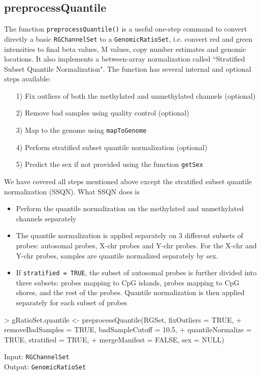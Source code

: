 \documentclass[12pt]{article}
\newcommand{\Rcode}[1]{{\texttt{#1}}}
\begin{document}
\subsection*{preprocessQuantile}
The function \Rcode{preprocessQuantile()} is a useful one-step command to convert directly a basic \Rcode{RGChannelSet} to a \Rcode{GenomicRatioSet}, i.e. convert red and green intensities to final beta values, M values, copy number estimates and genomic locations. It also implements a between-array normalization called ``Stratified Subset Quantile Normalization". The function has several internal and optional steps available: 
\begin{itemize}
\item[1)] Fix outliers of both the methylated and unmethylated channels (optional)
\item[2)] Remove bad samples using quality control (optional)
\item[3)] Map to the genome using \texttt{mapToGenome}
\item[4)] Perform stratified subset quantile normalization (optional)
\item[5)] Predict the sex if not provided using the function \texttt{getSex} 
\end{itemize}
We have covered all steps mentioned above except the stratified subset quantile normalization (SSQN). What SSQN does is 
\begin{itemize}
\item Perform the quantile normalization on the methylated and unmethylated channels separately
\item The quantile normalization is applied separately on 3 different subsets of probes: autosomal probes, X-chr probes and Y-chr probes. For the X-chr and Y-chr probes, samples are quantile normalized separately by sex.
\item If \texttt{stratified = TRUE}, the subset of autosomal probes is further divided into three subsets: probes mapping to CpG islands, probes mapping to CpG shores, and the rest of the probes. Quantile normalization is then applied separately for each subset of probes
\end{itemize}

\begin{Schunk}
\begin{Sinput}
> gRatioSet.quantile <- preprocessQuantile(RGSet, fixOutliers = TRUE,
+ removeBadSamples = TRUE, badSampleCutoff = 10.5,
+ quantileNormalize = TRUE, stratified = TRUE, 
+ mergeManifest = FALSE, sex = NULL)
\end{Sinput}
\end{Schunk}
Input: \Rcode{RGChannelSet}\\
Output: \Rcode{GenomicRatioSet}
\end{document}
